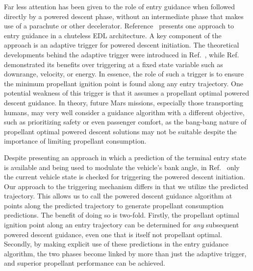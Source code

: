 \documentclass[letterpaper, preprint, paper,11pt]{AAS}
\begin{document}
Far less attention has been given to the role of entry guidance when followed directly by a powered descent phase, without an intermediate phase that makes use of a parachute or other decelerator. Reference~\cite{LuAdaptiveEDL} presents one approach to entry guidance in a chuteless EDL architecture. A key component of the approach is an adaptive trigger for powered descent initiation. The theoretical developments behind the adaptive trigger were introduced in Ref.~\cite{PropellantOptimalAdaptiveTrigger}, while Ref.~\cite{LuAdaptiveEDL} demonstrated its benefits over triggering at a fixed state variable such as downrange, velocity, or energy. In essence, the role of such a trigger is to ensure the minimum propellant ignition point is found along any entry trajectory. One potential weakness of this trigger is that it assumes a propellant optimal powered descent guidance. In theory, future Mars missions, especially those transporting humans, may very well consider a guidance algorithm with a different objective, such as prioritizing safety or even passenger comfort, as the bang-bang nature of propellant optimal powered descent solutions may not be suitable despite the importance of limiting propellant consumption. 

Despite presenting an approach in which a prediction of the terminal entry state is available and being used to modulate the vehicle's bank angle, in Ref.~\cite{LuAdaptiveEDL} only the current vehicle state is checked for triggering the powered descent initiation. Our approach to the triggering mechanism differs in that we utilize the predicted trajectory. This allows us to call the powered descent guidance algorithm at points along the predicted trajectory to generate propellant consumption predictions.  The benefit of doing so is two-fold. Firstly, the propellant optimal ignition point along an entry trajectory can be determined for \textit{any} subsequent powered descent guidance, even one that is itself not propellant optimal. Secondly, by making explicit use of these predictions in the entry guidance algorithm, the two phases become linked by more than just the adaptive trigger, and superior propellant performance can be achieved. 
\end{document}
